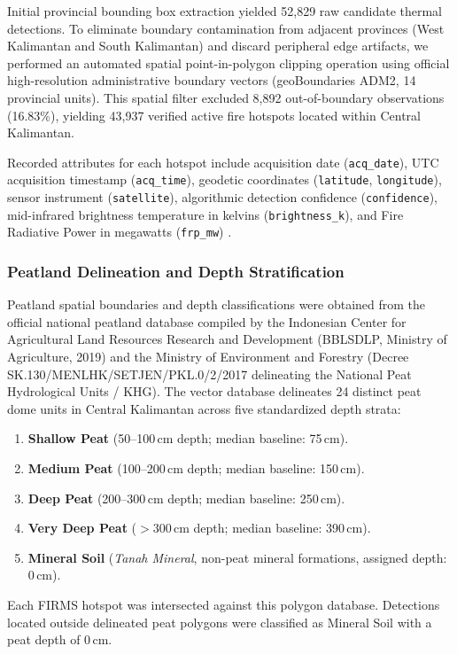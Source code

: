 Initial provincial bounding box extraction yielded 52,829 raw candidate thermal detections. To eliminate boundary contamination from adjacent provinces (West Kalimantan and South Kalimantan) and discard peripheral edge artifacts, we performed an automated spatial point-in-polygon clipping operation using official high-resolution administrative boundary vectors (geoBoundaries ADM2, 14 provincial units). This spatial filter excluded 8,892 out-of-boundary observations (16.83\%), yielding 43,937 verified active fire hotspots located within Central Kalimantan.

Recorded attributes for each hotspot include acquisition date (\texttt{acq\_date}), UTC acquisition timestamp (\texttt{acq\_time}), geodetic coordinates (\texttt{latitude}, \texttt{longitude}), sensor instrument (\texttt{satellite}), algorithmic detection confidence (\texttt{confidence}), mid-infrared brightness temperature in kelvins (\texttt{brightness\_k}), and Fire Radiative Power in megawatts (\texttt{frp\_mw}) \citep{Roberts2015RSE, Chuvieco2019ESSD}.

\subsubsection{Peatland Delineation and Depth Stratification}
\label{subsubsec:peat_depth}

Peatland spatial boundaries and depth classifications were obtained from the official national peatland database compiled by the Indonesian Center for Agricultural Land Resources Research and Development (BBLSDLP, Ministry of Agriculture, 2019) and the Ministry of Environment and Forestry (Decree SK.130/MENLHK/SETJEN/PKL.0/2/2017 delineating the National Peat Hydrological Units / KHG). The vector database delineates 24 distinct peat dome units in Central Kalimantan across five standardized depth strata:
\begin{enumerate}
    \item \textbf{Shallow Peat} (50--100\,cm depth; median baseline: 75\,cm).
    \item \textbf{Medium Peat} (100--200\,cm depth; median baseline: 150\,cm).
    \item \textbf{Deep Peat} (200--300\,cm depth; median baseline: 250\,cm).
    \item \textbf{Very Deep Peat} ($>300$\,cm depth; median baseline: 390\,cm).
    \item \textbf{Mineral Soil} (\textit{Tanah Mineral}, non-peat mineral formations, assigned depth: 0\,cm).
\end{enumerate}
Each FIRMS hotspot was intersected against this polygon database. Detections located outside delineated peat polygons were classified as Mineral Soil with a peat depth of 0\,cm.

